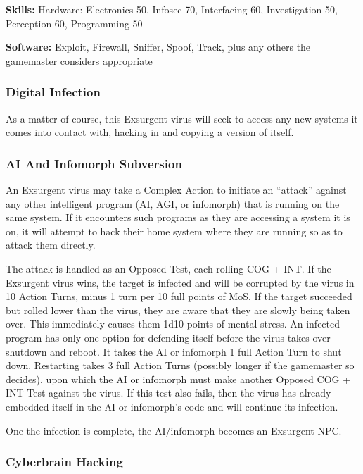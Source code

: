 \textbf{Skills:} Hardware: Electronics 50, Infosec 70, Interfacing 60, Investigation 50, Perception 60, Programming 50

\textbf{Software:} Exploit, Firewall, Sniffer, Spoof, Track, plus any others the gamemaster considers appropriate

\subsubsection{Digital Infection}

As a matter of course, this Exsurgent virus will seek 
to access any new systems it comes into contact with, 
hacking in and copying a version of itself.

\subsubsection{AI And Infomorph Subversion}

An Exsurgent virus may take a Complex Action to initiate
an ``attack'' against any other intelligent program
(AI, AGI, or infomorph) that is running on the same 
system. If it encounters such programs as they are accessing
a system it is on, it will attempt to hack their
home system where they are running so as to attack 
them directly. 

The attack is handled as an Opposed Test, each rolling
COG + INT. If the Exsurgent virus wins, the target
is infected and will be corrupted by the virus in 10 
Action Turns, minus 1 turn per 10 full points of MoS. 
If the target succeeded but rolled lower than the virus, 
they are aware that they are slowly being taken over. 
This immediately causes them 1d10 points of mental 
stress. An infected program has only one option for 
defending itself before the virus takes over—shutdown 
and reboot. It takes the AI or infomorph 1 full Action 
Turn to shut down. Restarting takes 3 full Action Turns 
(possibly longer if the gamemaster so decides), upon 
which the AI or infomorph must make another Opposed
COG + INT Test against the virus. If this test also
fails, then the virus has already embedded itself in the 
AI or infomorph's code and will continue its infection.

One the infection is complete, the AI/infomorph 
becomes an Exsurgent NPC.

\subsubsection{Cyberbrain Hacking}

